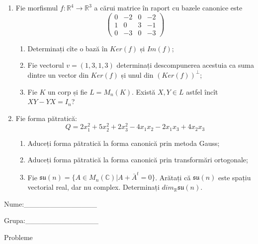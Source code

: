 \documentclass{article}
\begin{document}
\begin{enumerate}
 \item Fie morfismul $f:\mathbb{R}^4 \to \mathbb{R}^3$ a cărui matrice în raport cu bazele canonice este
$$\begin{pmatrix}
0&-2&0&-2\\
1&0&3&-1\\
0&-3&0&-3
\end{pmatrix}$$

\begin{enumerate}
\item Determinați cîte o bază în $Ker(f)$ și $Im(f)$;
\item Fie vectorul $v=(1,3,1,3)$ determinați descompunerea acestuia ca suma dintre un vector din $Ker(f)$ și unul din $(Ker(f))^\perp$;
\item Fie $K$ un corp și fie $L=M_n(K)$. Există $X,Y \in L$ astfel încît $XY-YX=I_n$?  
\end{enumerate}
\item Fie forma pătratică:
$$Q= 2x_1^2+5x_2^2+2x_3^2-4x_1x_2-2x_1x_3+4x_2x_3$$

\begin{enumerate}
\item Aduceți forma pătratică la forma canonică prin metoda Gauss;
\item Aduceți forma pătratică la forma canonică prin transformări ortogonale;
\item Fie $\mathfrak{su}(n)=\{ A \in M_n(\mathbb{C}) | A+\bar{A}^t=0\}$. Arătați că $\mathfrak{su}(n)$ este spațiu vectorial real, dar nu complex.
Determinați $dim_{\mathbb{R}}\mathfrak{su}(n)$.
\end{enumerate}
\end{enumerate}
\newpage
\begin{flushright}
Nume:\_\_\_\_\_\_\_\_\_\_\_\_\_\_
 
 
Grupa:\_\_\_\_\_\_\_\_\_\_\_\_\_\_
\end{flushright}
\begin{center}
\vspace{2cm}
{\Large Probleme}
\vspace{2cm}
\end{center}
\end{document}
